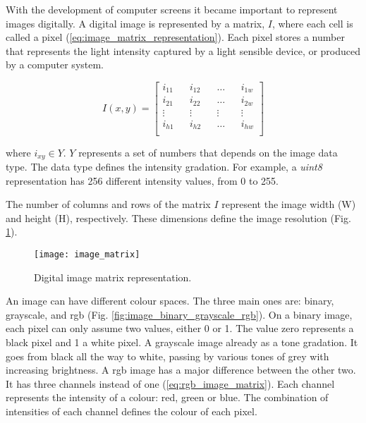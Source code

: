With the development of computer screens it became important to represent images digitally. A digital image is represented by a matrix, $I$, where each cell is called a pixel (\ref{eq:image_matrix_representation}). Each pixel stores a number that represents the light intensity captured by a light sensible device, or produced by a computer system.

\begin{equation}
    \label{eq:image_matrix_representation}
    I(x, y) = \begin{bmatrix}
        i_{11} && i_{12} && {}\ldots{} && i_{1w} \\
        i_{21} && i_{22} && {}\ldots{} && i_{2w} \\
        \vdots && \vdots  && \vdots  && \vdots \\
        i_{h1} && i_{h2} && {}\ldots{} && i_{hw}\\
    \end{bmatrix}
\end{equation}

where $i_{xy} \in Y$. $Y$ represents a set of numbers that depends on the image data type. The data type defines the intensity gradation. For example, a \textit{uint8} representation has 256 different intensity values, from 0 to 255.

The number of columns and rows of the matrix $I$ represent the image width (W) and height (H), respectively. These dimensions define the image resolution (Fig. \ref{fig:image_matrix}).\\

\begin{figure}[htbp]
	\centering
	\texttt{[image: image\_matrix]}
	\caption{Digital image matrix representation.}
	\label{fig:image_matrix}
\end{figure}

An image can have different colour spaces. The three main ones are: binary, grayscale, and \gls{rgb} (Fig. \ref{fig:image_binary_grayscale_rgb}). On a binary image, each pixel can only assume two values, either 0 or 1. The value zero represents a black pixel and 1 a white pixel. A grayscale image already as a tone gradation. It goes from black all the way to white, passing by various tones of grey with increasing brightness. A \gls{rgb} image has a major difference between the other two. It has three channels instead of one (\ref{eq:rgb_image_matrix}). Each channel represents the intensity of a colour: red, green or blue. The combination of intensities of each channel defines the colour of each pixel.

